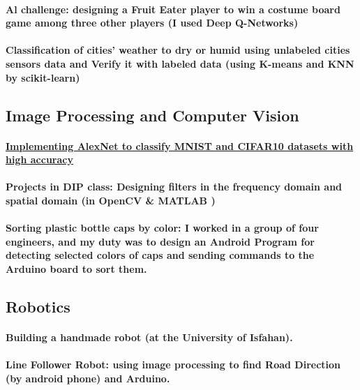 \documentclass[a4paper]{article}
\begin{document}
            \paragraph{Al challenge: designing a Fruit Eater player to win a costume board game among three other players (I used Deep Q-Networks)}
            \paragraph{Classification of cities' weather to dry or humid using unlabeled cities sensors data and Verify it with labeled data (using K-means and KNN by scikit-learn)}

        \subsection{Image Processing and Computer Vision}

            \paragraph{\href{https://github.com/ake1999/CNN_AlexNet}{Implementing  AlexNet to classify MNIST and CIFAR10 datasets with high accuracy}}
            \paragraph{Projects in DIP class: Designing filters in the frequency domain and spatial domain (in OpenCV \& MATLAB )}
            \paragraph{Sorting plastic bottle caps by color: I worked in a group of four engineers, and my duty was to design an Android Program for detecting selected colors of caps and sending commands to the Arduino board to sort them.}

        \subsection{Robotics}

            \paragraph{Building a handmade robot (at the University of Isfahan).}
            \paragraph{Line Follower Robot: using image processing to find Road Direction (by android phone) and Arduino.}
\end{document}

